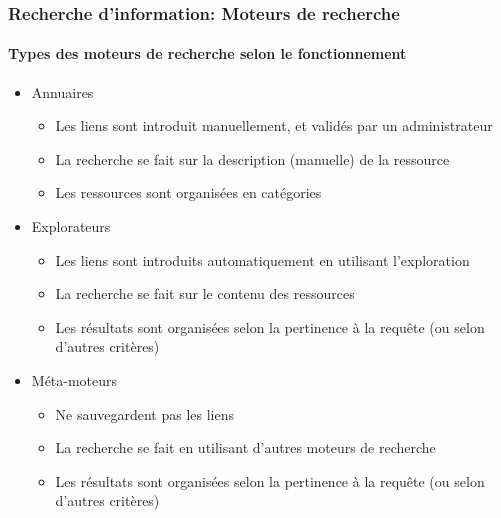 \documentclass{beamer}
\begin{document}
\begin{frame}
\frametitle{Recherche d'information: Moteurs de recherche}
\framesubtitle{Types des moteurs de recherche selon le fonctionnement}


\begin{itemize}
	\item Annuaires
	\begin{itemize}
		\item Les liens sont introduit manuellement, et validés par un administrateur
		\item La recherche se fait sur la description (manuelle) de la ressource 
		\item Les ressources sont organisées en catégories 
	\end{itemize}
	
	\item Explorateurs
	\begin{itemize}
		\item Les liens sont introduits automatiquement en utilisant l'exploration 
		\item La recherche se fait sur le contenu des ressources
		\item Les résultats sont organisées selon la pertinence à la requête (ou selon d'autres critères)
	\end{itemize}

	\item Méta-moteurs
	\begin{itemize}
		\item Ne sauvegardent pas les liens 
		\item La recherche se fait en utilisant d'autres moteurs de recherche
		\item Les résultats sont organisées selon la pertinence à la requête (ou selon d'autres critères)
	\end{itemize}
\end{itemize} 

\end{frame}
\end{document}
